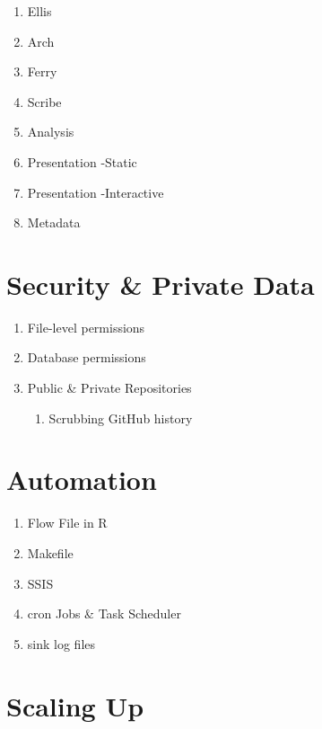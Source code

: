 \documentclass[]{book}
\providecommand{\tightlist}{%
  \setlength{\itemsep}{0pt}\setlength{\parskip}{0pt}}
\theoremstyle{definition}
\theoremstyle{definition}
\theoremstyle{definition}
\theoremstyle{remark}
\begin{document}
\begin{enumerate}
\def\labelenumi{\arabic{enumi}.}
\tightlist
\item
  Ellis
\item
  Arch
\item
  Ferry
\item
  Scribe
\item
  Analysis
\item
  Presentation -Static
\item
  Presentation -Interactive
\item
  Metadata
\end{enumerate}

\hypertarget{security-private-data}{%
\chapter{Security \& Private Data}\label{security-private-data}}

\begin{enumerate}
\def\labelenumi{\arabic{enumi}.}
\tightlist
\item
  File-level permissions
\item
  Database permissions
\item
  Public \& Private Repositories

  \begin{enumerate}
  \def\labelenumii{\arabic{enumii}.}
  \tightlist
  \item
    Scrubbing GitHub history
  \end{enumerate}
\end{enumerate}

\hypertarget{automation}{%
\chapter{Automation}\label{automation}}

\begin{enumerate}
\def\labelenumi{\arabic{enumi}.}
\tightlist
\item
  Flow File in R
\item
  Makefile
\item
  SSIS
\item
  cron Jobs \& Task Scheduler
\item
  sink log files
\end{enumerate}

\hypertarget{scaling-up}{%
\chapter{Scaling Up}\label{scaling-up}}
\end{document}
